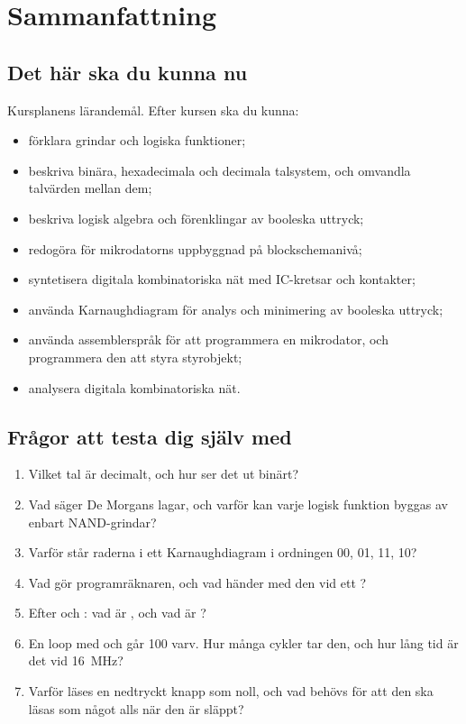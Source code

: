 
\section{Sammanfattning}
\label{c12:sec:summary}

\subsection*{Det här ska du kunna nu}
Kursplanens lärandemål. Efter kursen ska du kunna:
\begin{itemize}
  \item förklara grindar och logiska funktioner;
  \item beskriva binära, hexadecimala och decimala talsystem, och omvandla talvärden mellan dem;
  \item beskriva logisk algebra och förenklingar av booleska uttryck;
  \item redogöra för mikrodatorns uppbyggnad på blockschemanivå;
  \item syntetisera digitala kombinatoriska nät med IC-kretsar och kontakter;
  \item använda Karnaughdiagram för analys och minimering av booleska uttryck;
  \item använda assemblerspråk för att programmera en mikrodator, och programmera den att styra
    styrobjekt;
  \item analysera digitala kombinatoriska nät.
\end{itemize}

\subsection*{Frågor att testa dig själv med}
\begin{enumerate}
  \item Vilket tal är  decimalt, och hur ser det ut binärt?
  \item Vad säger De Morgans lagar, och varför kan varje logisk funktion byggas av enbart
    NAND-grindar?
  \item Varför står raderna i ett Karnaughdiagram i ordningen 00, 01, 11, 10?
  \item Vad gör programräknaren, och vad händer med den vid ett ?
  \item Efter  och : vad är , och vad är
    ?
  \item En loop med  och  går 100 varv. Hur många cykler tar den, och hur lång
    tid är det vid 16~MHz?
  \item Varför läses en nedtryckt knapp som noll, och vad behövs för att den ska läsas som något
    alls när den är släppt?
\end{enumerate}

